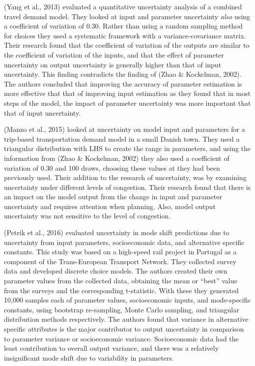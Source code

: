 \documentclass[
  letterpaper,
  number,
  review,
  3p]{elsarticle}
\begin{document}
(Yang et al., 2013) evaluated a quantitative uncertainty analysis of a
combined travel demand model. They looked at input and parameter
uncertainty \emph{also} using a coefficient of variation of 0.30. Rather
than using a random sampling method for choices they used a systematic
framework with a variance-covariance matrix. Their research found that
the coefficient of variation of the outputs are similar to the
coefficient of variation of the inputs, and that the effect of parameter
uncertainty on output uncertainty is generally higher than that of input
uncertainty. This finding contradicts the finding of (Zhao \& Kockelman,
2002). The authors concluded that improving the accuracy of parameter
estimation is more effective that that of improving input estimation as
they found that in most steps of the model, the impact of parameter
uncertainty was more important that that of input uncertainty.

(Manzo et al., 2015) looked at uncertainty on model input and parameters
for a trip-based transportation demand model in a small Danish town.
They used a triangular distribution with LHS to create the range in
parameters, and using the information from (Zhao \& Kockelman, 2002)
they also used a coefficient of variation of 0.30 and 100 draws,
choosing these values at they had been previously used. Their addition
to the research of uncertainty, was by examining uncertainty under
different levels of congestion. Their research found that there is an
impact on the model output from the change in input and parameter
uncertainty and requires attention when planning. Also, model output
uncertainty was not sensitive to the level of congestion.

(Petrik et al., 2016) evaluated uncertainty in mode shift predictions
due to uncertainty from input parameters, socioeconomic data, and
alternative specific constants. This study was based on a high-speed
rail project in Portugal as a component of the Trans-European Transport
Network. They collected survey data and developed discrete choice
models. The authors created their own parameter values from the
collected data, obtaining the mean or ``best'' value from the surveys
and the corresponding t-statistic. With these they generated 10,000
samples each of parameter values, socioeconomic inputs, and
mode-specific constants, using bootstrap re-sampling, Monte Carlo
sampling, and triangular distribution methods respectively. The authors
found that variance in alternative specific attributes is the major
contributor to output uncertainty in comparison to parameter variance or
socioeconomic variance. Socioeconomic data had the least contribution to
overall output variance, and there was a relatively insignificant mode
shift due to variability in parameters.
\end{document}
